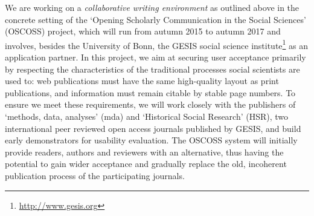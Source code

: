 \documentclass[a4paper,UKenglish]{dagrep}
\begin{document}
We are working on a \emph{collaborative writing environment} as outlined above
in the concrete setting of the `Opening Scholarly Communication in the Social
Sciences' (OSCOSS) project, which will run from autumn 2015 to autumn 2017 and
involves, besides the University of Bonn, the GESIS social science
institute\footnote{\url{http://www.gesis.org}} as an application partner.
In this project, we aim at securing user acceptance primarily by respecting the
characteristics of the traditional processes social scientists are used to: web
publications must have the same high-quality layout as print publications, and
information must remain citable by stable page numbers.
To ensure we meet these requirements, we will work closely with the publishers
of `methods, data, analyses' (mda) and `Historical Social Research' (HSR), two
international peer reviewed open access journals published by GESIS, and build
early demonstrators for usability evaluation.
The OSCOSS system will initially provide readers, authors and reviewers with an
alternative, thus having the potential to gain wider acceptance and gradually
replace the old, incoherent publication process of the participating journals.
\end{document}
